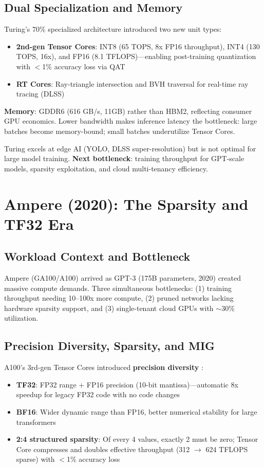 \documentclass{article}
\begin{document}
\subsection{Dual Specialization and Memory}

Turing's 70\% specialized architecture introduced two new unit types:
\begin{itemize}
\item \textbf{2nd-gen Tensor Cores}: INT8 (65 TOPS, 8x FP16 throughput), INT4 (130 TOPS, 16x), and FP16 (8.1 TFLOPS)---enabling post-training quantization with $<$1\% accuracy loss via QAT
\item \textbf{RT Cores}: Ray-triangle intersection and BVH traversal for real-time ray tracing (DLSS)
\end{itemize}

\textbf{Memory}: GDDR6 (616 GB/s, 11GB) rather than HBM2, reflecting consumer GPU economics. Lower bandwidth makes inference latency the bottleneck: large batches become memory-bound; small batches underutilize Tensor Cores.

Turing excels at edge AI (YOLO, DLSS super-resolution) but is not optimal for large model training. \textbf{Next bottleneck}: training throughput for GPT-scale models, sparsity exploitation, and cloud multi-tenancy efficiency.

\section{Ampere (2020): The Sparsity and TF32 Era}

\subsection{Workload Context and Bottleneck}

Ampere (GA100/A100) arrived as GPT-3 (175B parameters, 2020) \cite{brown2020language} created massive compute demands. Three simultaneous bottlenecks: (1) training throughput needing 10--100x more compute, (2) pruned networks lacking hardware sparsity support, and (3) single-tenant cloud GPUs with $\sim$30\% utilization.

\subsection{Precision Diversity, Sparsity, and MIG}

A100's 3rd-gen Tensor Cores introduced \textbf{precision diversity} \cite{nvidia2020ampere}:
\begin{itemize}
\item \textbf{TF32}: FP32 range + FP16 precision (10-bit mantissa)---automatic 8x speedup for legacy FP32 code with no code changes
\item \textbf{BF16}: Wider dynamic range than FP16, better numerical stability for large transformers
\item \textbf{2:4 structured sparsity}: Of every 4 values, exactly 2 must be zero; Tensor Core compresses and doubles effective throughput (312 $\to$ 624 TFLOPS sparse) with $<$1\% accuracy loss \cite{mishra2021accelerating}
\end{itemize}
\end{document}
